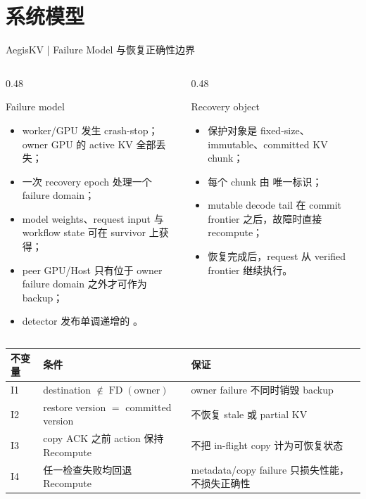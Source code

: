 \section{系统模型}

\begin{frame}{AegisKV | Failure Model 与恢复正确性边界}
  \scriptsize
  \begin{columns}[T,onlytextwidth]
    \begin{column}{0.48\textwidth}
      \begin{block}{Failure model}
        \begin{itemize}
          \tightitems
          \item worker/GPU 发生 crash-stop；owner GPU 的 active KV 全部丢失；
          \item 一次 recovery epoch 处理一个 failure domain；
          \item model weights、request input 与 workflow state 可在 survivor 上获得；
          \item peer GPU/Host 只有位于 owner failure domain 之外才可作为 backup；
          \item detector 发布单调递增的 。
        \end{itemize}
      \end{block}
    \end{column}
    \begin{column}{0.48\textwidth}
      \begin{block}{Recovery object}
        \begin{itemize}
          \tightitems
          \item 保护对象是 fixed-size、immutable、committed KV chunk；
          \item 每个 chunk 由  唯一标识；
          \item mutable decode tail 在 commit frontier 之后，故障时直接 recompute；
          \item 恢复完成后，request 从 verified frontier 继续执行。
        \end{itemize}
      \end{block}
    \end{column}
  \end{columns}

  \vspace{0.10cm}
  \renewcommand{\arraystretch}{1.16}
  \begin{tabularx}{\textwidth}{p{}p{}X}
    \toprule
    不变量 & 条件 & 保证 \\
    \midrule
    I1 & destination $\notin\operatorname{FD}(\mathrm{owner})$ & owner failure 不同时销毁 backup \\
    I2 & restore version $=$ committed version & 不恢复 stale 或 partial KV \\
    I3 & copy ACK 之前 action 保持 Recompute & 不把 in-flight copy 计为可恢复状态 \\
    I4 & 任一检查失败均回退 Recompute & metadata/copy failure 只损失性能，不损失正确性 \\
    \bottomrule
  \end{tabularx}

  \vspace{0.08cm}
\end{frame}
